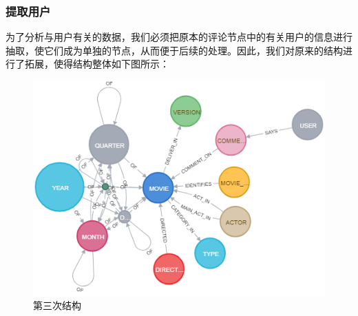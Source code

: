 \documentclass{ctexrep}
\begin{document}
	\subsubsection{提取用户}\label{neo:3}
	为了分析与用户有关的数据，我们必须把原本的评论节点中的有关用户的信息进行抽取，使它们成为单独的节点，从而便于后续的处理。因此，我们对原来的结构进行了拓展，使得结构整体如下图所示：
	\begin{figure}[H]
		\centering
		\includegraphics[width=0.7\linewidth]{img/graph3}
		\caption{第三次结构}
		\label{fig:graph3}
	\end{figure}
	
\end{document}
